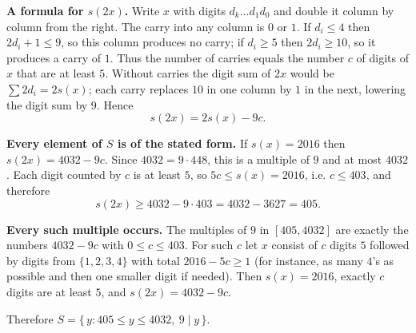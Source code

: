 \textbf{A formula for $s(2x)$.} Write $x$ with digits $d_k\dots d_1d_0$ and double it column by column from the right. The carry into any column is $0$ or $1$. If $d_i\le4$ then $2d_i+1\le9$, so this column produces no carry; if $d_i\ge5$ then $2d_i\ge10$, so it produces a carry of $1$. Thus the number of carries equals the number $c$ of digits of $x$ that are at least $5$. Without carries the digit sum of $2x$ would be $\sum 2d_i=2s(x)$; each carry replaces $10$ in one column by $1$ in the next, lowering the digit sum by $9$. Hence
\[
s(2x)=2s(x)-9c .
\]

\textbf{Every element of $S$ is of the stated form.} If $s(x)=2016$ then $s(2x)=4032-9c$. Since $4032=9\cdot448$, this is a multiple of $9$ and at most $4032$. Each digit counted by $c$ is at least $5$, so $5c\le s(x)=2016$, i.e. $c\le403$, and therefore
\[
s(2x)\ge4032-9\cdot403=4032-3627=405 .
\]

\textbf{Every such multiple occurs.} The multiples of $9$ in $[405,4032]$ are exactly the numbers $4032-9c$ with $0\le c\le403$. For such $c$ let $x$ consist of $c$ digits $5$ followed by digits from $\{1,2,3,4\}$ with total $2016-5c\ge1$ (for instance, as many $4$'s as possible and then one smaller digit if needed). Then $s(x)=2016$, exactly $c$ digits are at least $5$, and $s(2x)=4032-9c$.

Therefore $S=\{\,y : 405\le y\le4032,\ 9\mid y\,\}$.
